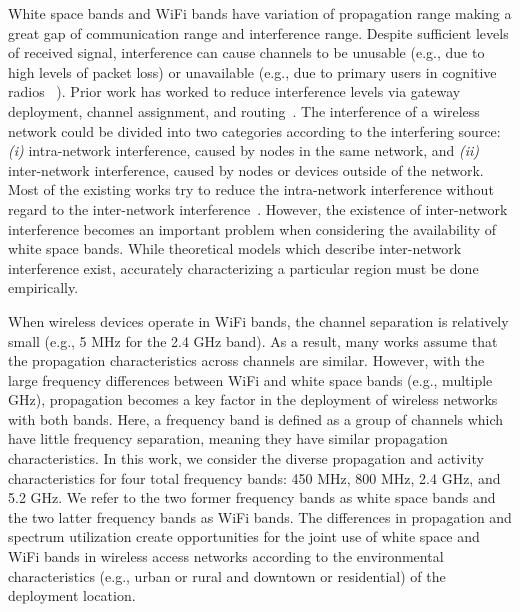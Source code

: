 White space bands and WiFi bands have
variation of propagation range making a great gap of communication range
and interference range. Despite sufficient levels of received signal, 
interference can cause channels to be unusable (e.g., due to high levels of 
packet loss) or unavailable (e.g., due to primary users in cognitive radios
~\cite{haykin2005cognitive}). Prior work has worked to reduce interference 
levels via gateway deployment, channel assignment, and routing~\cite{he2008optimizing,tang2005interference}.
The interference of a wireless network could be divided into two categories
according to the interfering source: {\it (i)} intra-network interference,
caused by nodes in the same network, and {\it (ii)} inter-network interference,
caused by nodes or devices outside of the network. Most of the existing works
try to reduce the intra-network interference without regard to the inter-network 
interference~\cite{si2010overview}. However, the existence of inter-network 
interference becomes an important problem when considering the availability
of white space bands.  While theoretical models which describe inter-network 
interference exist, accurately characterizing a particular region must be done empirically.

When wireless devices operate in WiFi bands, the channel separation is relatively 
small (e.g., 5 MHz for the 2.4 GHz band). As a result, many works assume that
the propagation characteristics across channels are similar. However, with the
large frequency differences between WiFi and white space bands (e.g., multiple GHz),
propagation becomes a key factor in the deployment of wireless networks with both bands.
Here, a frequency band is defined as a group of channels which have
little frequency separation, meaning they have similar propagation characteristics.
In this work, we consider the diverse propagation and activity characteristics
for four total frequency bands: 450 MHz, 800 MHz, 2.4 GHz, and 5.2 GHz.
We refer to the two former frequency bands as white space bands and
the two latter frequency bands as WiFi bands.
The differences in propagation and spectrum utilization create opportunities
for the joint use of white space and WiFi bands in wireless access networks according
to the environmental characteristics (e.g., urban or rural and downtown or residential)
of the deployment location.

